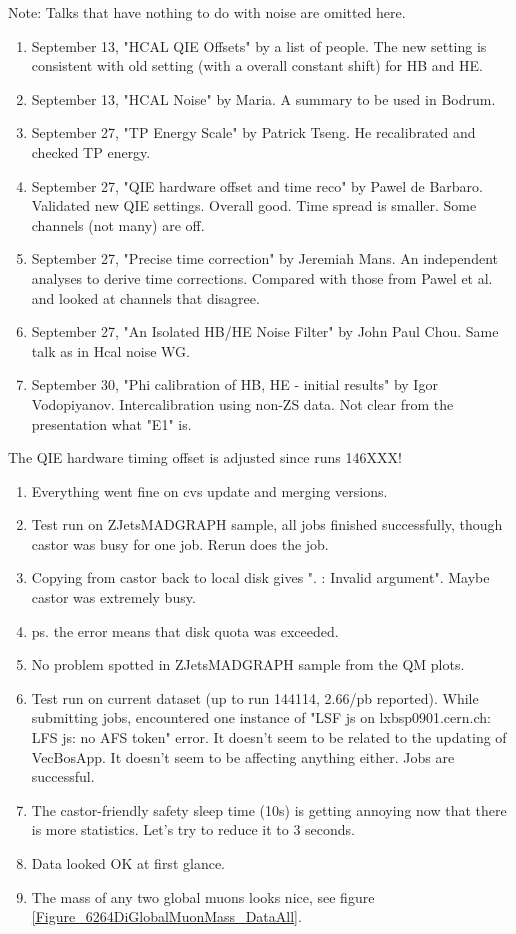 
Note: Talks that have nothing to do with noise are omitted here.

\begin{enumerate}
\item September 13, "HCAL QIE Offsets" by a list of people.  The new setting is consistent with old setting (with a overall constant shift) for HB and HE.
\item September 13, "HCAL Noise" by Maria.  A summary to be used in Bodrum.
\item September 27, "TP Energy Scale" by Patrick Tseng.  He recalibrated and checked TP energy.
\item September 27, "QIE hardware offset and time reco" by Pawel de Barbaro.  Validated new QIE settings.  Overall good.  Time spread is smaller.  Some channels (not many) are off.
\item September 27, "Precise time correction" by Jeremiah Mans.  An independent analyses to derive time corrections.  Compared with those from Pawel et al. and looked at channels that disagree.
\item September 27, "An Isolated HB/HE Noise Filter" by John Paul Chou.  Same talk as in Hcal noise WG.
\item September 30, "Phi calibration of HB, HE - initial results" by Igor Vodopiyanov.  Intercalibration using non-ZS data.  Not clear from the presentation what "E1" is.
\end{enumerate}

The QIE hardware timing offset is adjusted since runs 146XXX! 


\begin{enumerate}
\item Everything went fine on cvs update and merging versions.
\item Test run on ZJetsMADGRAPH sample, all jobs finished successfully, though castor was busy for one job.  Rerun does the job.
\item Copying from castor back to local disk gives ". : Invalid argument".  Maybe castor was extremely busy.
\item ps. the error means that disk quota was exceeded.
\item No problem spotted in ZJetsMADGRAPH sample from the QM plots.
\item Test run on current dataset (up to run 144114, 2.66/pb reported).  While submitting jobs, encountered one instance of
"LSF js on lxbsp0901.cern.ch: LFS js: no AFS token" error.  It doesn't seem to be related to the updating of VecBosApp.
It doesn't seem to be affecting anything either.  Jobs are successful.
\item The castor-friendly safety sleep time (10s) is getting annoying now that there is more statistics.  Let's try to reduce it to 3 seconds.
\item Data looked OK at first glance.
\item The mass of any two global muons looks nice, see figure \ref{Figure_6264DiGlobalMuonMass_DataAll}.
\end{enumerate}

